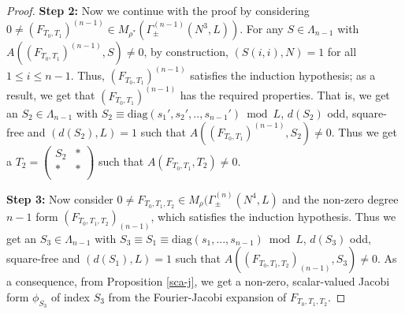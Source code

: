 \documentclass[11pt]{amsart}
\numberwithin{equation}{section}
\newcommand{\mrm}{\mathrm} %
\newcommand{\smat}[4]{\left( \begin{smallmatrix} #1 & #2 \\ #3 & #4 \\ \end{smallmatrix} \right)}
\newcommand{\Mrho}[2]{M_\rho(\Gamma_\pm^{(#1)}(#2, L)}
\begin{document}
\begin{proof}
\textbf{Step 2:} Now we continue with the proof by considering $0\neq (F_{T_0,T_1})^{(n-1)}\in M_{\rho^*}(\Gamma_\pm^{(n-1)}(N^3, L))$.  For any $S\in \Lambda_{n-1}$ with $A((F_{T_0,T_1})^{(n-1)},S)\neq 0$, by construction, $(S(i,i),N)=1$ for all $1\le i\le n-1$. Thus, $(F_{T_0,T_1})^{(n-1)}$ satisfies the induction hypothesis; as a result, we get that $(F_{T_0,T_1})^{(n-1)}$ has the required properties. That is, we get an $S_2\in \Lambda_{n-1}$ with $S_2\equiv \mrm{diag}(s_1', s_2',..,s_{n-1}')\bmod L$, $d(S_2)$ odd, square-free and $(d(S_2),L)=1$ such that $A((F_{T_0,T_1})^{(n-1)}, S_2)\neq 0$. Thus we get a $T_2=\smat{S_2}{*}{*}{*}$ such that $A(F_{T_0,T_1},T_2)\neq 0$.

\textbf{Step 3:}\label{Step3:Theorem1.3} Now consider $0\neq F_{T_0,T_1,T_2}\in \Mrho{n}{N^4}$ and the non-zero degree $n-1$ form $(F_{T_0, T_1, T_2})_{(n-1)}$, which satisfies the induction hypothesis. Thus we get an $S_3 \in \Lambda_{n-1}$ with $S_3\equiv S_1\equiv \mrm{diag}(s_1,...,s_{n-1})\bmod L$, $d(S_3)$ odd, square-free  and $(d(S_1), L)=1$ such that $A((F_{T_0,T_1,T_2})_{(n-1)}, S_3)\neq 0$.  As a consequence,  from Proposition \ref{sca-j}, we get a non-zero, scalar-valued Jacobi form $\phi_{S_3}$ of index $S_3$ from the Fourier-Jacobi expansion of $F_{T_0,T_1,T_2}$.


\end{proof}
\end{document}
